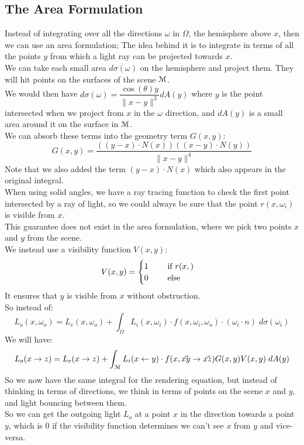 \documentclass[12pt]{article}
\begin{document}
\newpage

\subsection*{The Area Formulation}

Instead of integrating over all the directions
$\omega$ in $\Omega$, the hemisphere
above $x$,
then we can use an area formulation;
The idea behind it is to integrate
in terms of all the points $y$
from which a light ray can be projected
towards $x$. \\

We can take each small area $d\sigma(\omega)$
on the hemisphere and project them.
They will hit points on the surfaces
of the scene $\mathcal{M}$. \\

We would then have $d\sigma(\omega)
= \dfrac{\cos(\theta)y}{\|x-y\|^2}dA(y)$
where $y$ is the point intersected
when we project from $x$ in the $\omega$
direction, and $dA(y)$ is a small area around it
on the surface in $\mathcal{M}$. \\

We can absorb these terms into the
geometry term $G(x, y)$:
\[ G(x, y) = \dfrac{((y-x)\cdot N(x))((x-y)\cdot N(y))}
{\|x-y\|^4} \]
Note that we also added the term $(y-x)\cdot N(x)$
which also appears in the original integral. \\

When using solid angles, we have a ray tracing 
function to check the first point intersected
by a ray of light, so we could always be sure
that the point $r(x, \omega_i)$ is visible
from $x$. \\
This guarantee does not exist in the area formulation,
where we pick two points $x$ and $y$ from
the scene. \\
We instead use a visibility function $V(x, y)$:
\[ V(x, y) = \begin{cases} 
    1 \qquad \text{ if } r(x, ) \\
    0 \qquad \text{ else }
 \end{cases} \]
It ensures that $y$ is visible from $x$
without obstruction. \\

So instead of:
\[  L_{o}(x, \omega_o)= L_{e}(x, \omega_o) +
\int_\Omega L_{i}(x, \omega_i) \cdot
f(x, \omega_i, \omega_o) \cdot
(\omega_i \cdot n) \; d\sigma(\omega_i) \]
We will have:
\[  L_{o}(x \to z)= L_{e}(x \to z) +
\int_{\mathcal{M}} L_{i}(x \leftarrow y) \cdot
f(x, \vec{xy} \to \vec{xz}) G(x, y) V(x, y) \; dA(y) \]
So we now have the same integral
for the rendering equation, but instead
of thinking in terms of directions, we think
in terms of points on the scene $x$ and $y$,
and light bouncing between them. \\
So we can get the outgoing light $L_o$
at a point $x$ in the direction towards a point $y$,
which is $0$ if the visibility function
determines we can't see $x$ from $y$ and vice-versa. \\
\end{document}
